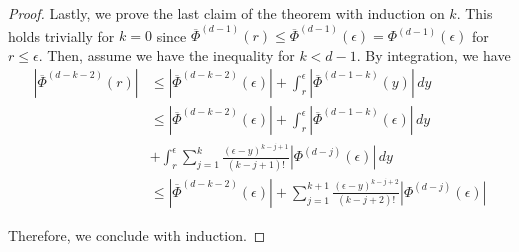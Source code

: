 \begin{proof}
Lastly, we prove the last claim of the theorem with induction on $k$. This holds trivially for $k = 0$ since $\overline{\Phi}^{(d-1)}(r) \leq \overline{\Phi}^{(d-1)}(\epsilon) = \Phi^{(d-1)}(\epsilon)$ for $r \leq \epsilon$. Then, assume we have the inequality for $k < d-1$. By integration, we have
\begin{align*}
|\overline{\Phi}^{(d-k-2)}(r)| & \leq |\overline{\Phi}^{(d-k-2)}(\epsilon)| + \int_r^\epsilon |\overline{\Phi}^{(d-1 -k)}(y)| \, dy \\
& \leq |\overline{\Phi}^{(d-k-2)}(\epsilon)| + \int_r^\epsilon |\overline{\Phi}^{(d-1 -k)}(\epsilon)| \, dy \\
& + \int_r^\epsilon \sum_{j=1}^k \frac{(\epsilon -y)^{k-j+1}}{(k-j+1)!}|\Phi^{(d-j)}(\epsilon)| \, dy \\
& \leq  |\overline{\Phi}^{(d-k-2)}(\epsilon)| + \sum_{j=1}^{k+1}  \frac{(\epsilon -y)^{k-j+2}}{(k-j+2)!}|\Phi^{(d-j)}(\epsilon)|
\end{align*}

Therefore, we conclude with induction.
\end{proof}

\almostharmreal*

